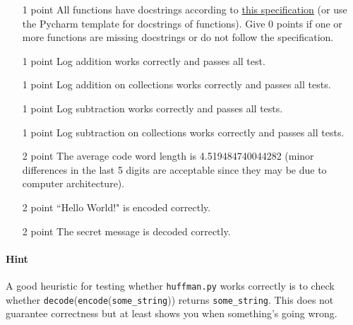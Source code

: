 \documentclass[11pt, leqno, a4paper]{article}
\begin{document}
\begin{itemize}
\item[1 point] All functions have docstrings according to \href{https://www.python.org/dev/peps/pep-0257/}{this specification} (or use the Pycharm template for docstrings of functions). Give 0 points if one or more
functions are missing docstrings or do not follow the specification.
\item[1 point] Log addition works correctly and passes all test.
\item[1 point] Log addition on collections works correctly and passes all tests.
\item[1 point] Log subtraction works correctly and passes all tests.
\item[1 point] Log subtraction on collections works correctly and passes all tests.
\item[2 point] The average code word length is 4.519484740044282 (minor differences in the last 5 digits are acceptable since they may be due to computer
architecture).
\item[2 point] ``Hello World!" is encoded correctly.
\item[2 point] The secret message is decoded correctly.
\end{itemize}
\paragraph{Hint} A good heuristic for testing whether \texttt{huffman.py} works correctly is to check whether \texttt{decode}(\texttt{encode}(\texttt{some\_string}))
returns \texttt{some\_string}. This does not guarantee correctness but at least shows you when something's going wrong.
\end{document}
